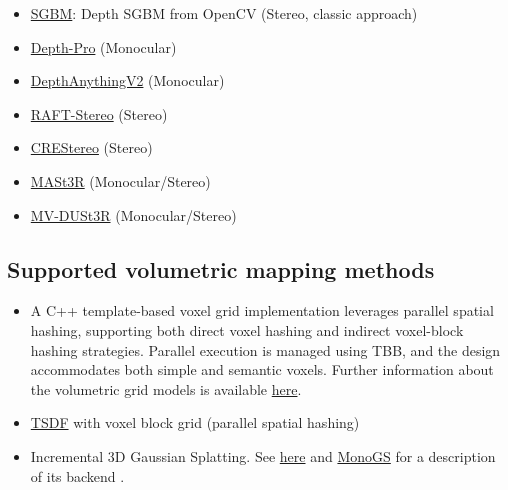 \documentclass{article}
\providecommand{\tightlist}{%
  \setlength{\itemsep}{0pt}\setlength{\parskip}{0pt}}
\begin{document}
\begin{itemize}
\tightlist
\item
  \href{https://ieeexplore.ieee.org/document/4359315}{SGBM}\cite{hirschmuller2007stereo}: Depth SGBM
  from OpenCV (Stereo, classic approach) 
\item
  \href{https://arxiv.org/abs/2410.02073}{Depth-Pro} (Monocular) \cite{depthpro2023}
\item
  \href{https://arxiv.org/abs/2406.09414}{DepthAnythingV2} (Monocular) \cite{depthanythingv2_2024}
\item
  \href{https://arxiv.org/abs/2109.07547}{RAFT-Stereo} (Stereo) \cite{teed2021raft}
\item
  \href{https://arxiv.org/abs/2203.11483}{CREStereo} (Stereo) \cite{li2022cres}
\item
  \href{https://arxiv.org/abs/2406.09756}{MASt3R} (Monocular/Stereo) \cite{master}
\item
  \href{https://arxiv.org/abs/2412.06974}{MV-DUSt3R} (Monocular/Stereo) \cite{mvduster}    
\end{itemize}

\hypertarget{supported-volumetric-mapping-methods}{%
\subsection{Supported volumetric mapping
methods}\label{supported-volumetric-mapping-methods}}

\begin{itemize}
\tightlist
\item
  A C++ template-based voxel grid implementation leverages parallel
  spatial hashing, supporting both direct voxel hashing and indirect
  voxel-block hashing strategies. Parallel execution is managed using
  TBB, and the design accommodates both simple and semantic voxels.
  Further information about the volumetric grid models is available
  \href{https://github.com/luigifreda/pyslam/blob/master/cpp/modules/volumetric/README.md}{here}.
\item    
  \href{https://arxiv.org/pdf/2110.00511}{TSDF} with voxel block grid
  (parallel spatial hashing)~\cite{dong2022ash}
\item
  Incremental 3D Gaussian Splatting. See
  \href{https://repo-sam.inria.fr/fungraph/3d-gaussian-splatting/}{here}
  and \href{https://arxiv.org/abs/2312.06741}{MonoGS} for a description
  of its backend \cite{matsuki2023gaussian, kerbl20233d}.
\end{itemize}
\end{document}
